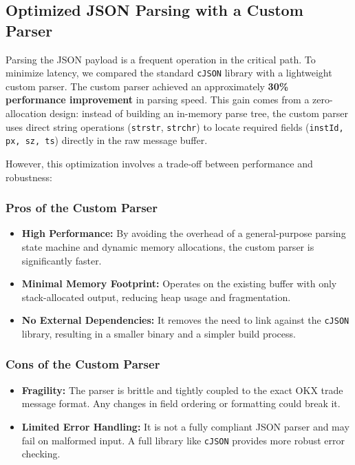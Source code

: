 \documentclass[12pt,a4paper]{article}
\begin{document}
\subsection{Optimized JSON Parsing with a Custom Parser}

Parsing the JSON payload is a frequent operation in the critical path. To minimize latency, we compared the standard \texttt{cJSON} library with a lightweight custom parser. The custom parser achieved an approximately \textbf{30\% performance improvement} in parsing speed. This gain comes from a zero-allocation design: instead of building an in-memory parse tree, the custom parser uses direct string operations (\texttt{strstr}, \texttt{strchr}) to locate required fields (\texttt{instId, px, sz, ts}) directly in the raw message buffer. 

However, this optimization involves a trade-off between performance and robustness:

\subsubsection*{Pros of the Custom Parser}
\begin{itemize}
    \item \textbf{High Performance:} By avoiding the overhead of a general-purpose parsing state machine and dynamic memory allocations, the custom parser is significantly faster.
    \item \textbf{Minimal Memory Footprint:} Operates on the existing buffer with only stack-allocated output, reducing heap usage and fragmentation.
    \item \textbf{No External Dependencies:} It removes the need to link against the \texttt{cJSON} library, resulting in a smaller binary and a simpler build process.
\end{itemize}

\subsubsection*{Cons of the Custom Parser}
\begin{itemize}
    \item \textbf{Fragility:} The parser is brittle and tightly coupled to the exact OKX trade message format. Any changes in field ordering or formatting could break it.
    \item \textbf{Limited Error Handling:} It is not a fully compliant JSON parser and may fail on malformed input. A full library like \texttt{cJSON} provides more robust error checking.
\end{itemize}
\end{document}
